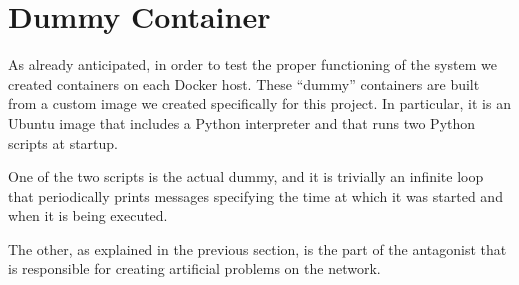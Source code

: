 \section{Dummy Container}
As already anticipated, in order to test the proper functioning of the system we created containers on each Docker host. These “dummy” containers are built from a custom image we created specifically for this project. In particular, it is an Ubuntu image that includes a Python interpreter and that runs two Python scripts at startup.

\noindent One of the two scripts is the actual dummy, and it is trivially an infinite loop that periodically prints messages specifying the time at which it was started and when it is being executed.

\noindent The other, as explained in the previous section, is the part of the antagonist that is responsible for creating artificial problems on the network.
